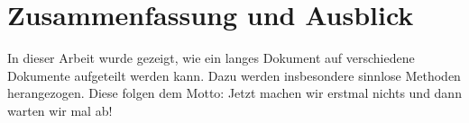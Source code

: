 \chapter{Zusammenfassung und Ausblick}

In dieser Arbeit wurde gezeigt, wie ein langes Dokument auf verschiedene Dokumente aufgeteilt werden kann. Dazu werden insbesondere sinnlose Methoden herangezogen. Diese folgen dem Motto: Jetzt machen wir erstmal nichts und dann warten wir mal ab!